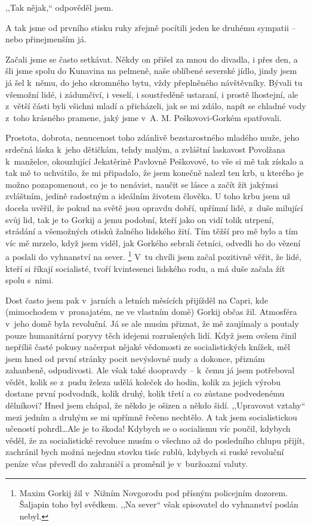 ,,Tak nějak,`` odpověděl jsem.

A tak jsme od prvního stisku ruky zřejmě pocítili jeden ke druhému sympatii -- nebo přinejmenším já. 

Začali jsme se často setkávat. Někdy on přišel za mnou do divadla, i přes den, a šli jsme spolu do Kunavina na pelmeně, naše oblíbené severské jídlo, jindy jsem já šel k němu, do jeho skromného bytu, vždy přeplněného návštěvníky. Bývali tu všemožní lidé, i zádumčiví, i veselí, i soustředěně ustaraní, i prostě lhostejní, ale z větší části byli všichni mladí a přicházeli, jak se mi zdálo, napít se chladné vody z toho krásného pramene, jaký jsme v A. M. Peškovovi-Gorkém spatřovali.

Prostota, dobrota, nenucenost toho zdánlivě bezstarostného mladého muže, jeho srdečná láska k jeho dětičkám, tehdy malým, a zvláštní laskavost Povolžana k manželce, okouzlující Jekatěrině Pavlovně Peškovové, to vše si mě tak získalo a tak mě to uchvátilo, že mi připadalo, že jsem konečně nalezl ten krb, u kterého je možno pozapomenout, co je to nenávist, naučit se lásce a začít žít jakýmsi zvláštním, jedině radostným a ideálním životem člověka. U toho krbu jsem už docela uvěřil, že pokud na světě jsou opravdu dobří, upřímní lidé, z duše milující svůj lid, tak je to Gorkij a jemu podobní, kteří jako on vidí tolik utrpení, strádání a všemožných otisků žalného lidského žití. Tím těžší pro mě bylo a tím víc mě mrzelo, když jsem viděl, jak Gorkého sebrali četníci, odvedli ho do vězení a poslali do vyhnanství na sever. \footnote{Maxim Gorkij žil v Nižním Novgorodu pod přísným policejním dozorem. Šaljapin toho byl svědkem. ,,Na sever`` však spisovatel do vyhnanství poslán nebyl.} V tu chvíli jsem začal pozitivně věřit, že lidé, kteří si říkají socialisté, tvoří kvintesenci lidského rodu, a má duše začala žít spolu s nimi. 

Dost často jsem pak v jarních a letních měsících přijížděl na Capri, kde (mimochodem v pronajatém, ne ve vlastním domě) Gorkij občas žil. Atmosféra v jeho domě byla revoluční. Já se ale musím přiznat, že mě zaujímaly a poutaly pouze humanitární poryvy těch idejemi rozrušených lidí. Když jsem ovšem činil nepříliš časté pokusy načerpat nějaké vědomosti ze socialistických knížek, měl jsem hned od první stránky pocit nevýslovné nudy a dokonce, přiznám zahanbeně, odpudivosti. Ale však také doopravdy -- k čemu já jsem potřeboval vědět, kolik se z pudu železa udělá koleček do hodin, kolik za jejich výrobu dostane první podvodník, kolik druhý, kolik třetí a co zůstane podvedenému dělníkovi? Hned jsem chápal, že někdo je ošizen a někdo šidí. ,,Upravovat vztahy`` mezi jedním a druhým se mi upřímně řečeno nechtělo. A tak jsem socialistickou učeností pohrdl\ldots Ale je to škoda! Kdybych se o socialismu víc poučil, kdybych věděl, že za socialistické revoluce musím o všechno až do posledního chlupu přijít, zachránil bych možná nejednu stovku tisíc rublů, kdybych si ruské revoluční peníze včas převedl do zahraničí a proměnil je v buržoazní valuty.

